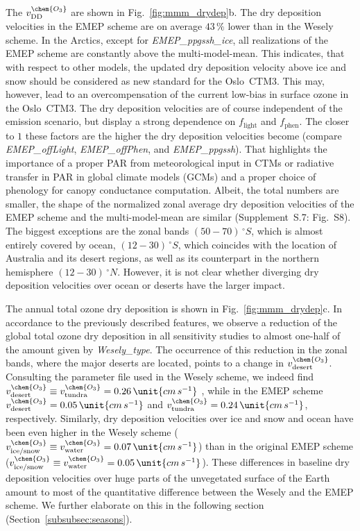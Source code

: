\documentclass[gmd, manuscript]{copernicus}
\begin{document}
The $v^\chem{O_3}_\text{DD}$ are shown in Fig.~\ref{fig:mmm_drydep}b. The dry deposition velocities in the EMEP scheme are on average $43\,\unit{\%}$ lower than in the Wesely scheme. In the Arctics, except for \emph{EMEP\_ppgssh\_ice}, all realizations of the EMEP scheme are constantly above the multi-model-mean. This indicates, that with respect to other models, the updated dry deposition velocity above ice and snow should be considered as new standard for the Oslo~CTM3. This may, however, lead to an overcompensation of the current low-bias in surface ozone in the Oslo~CTM3. The dry deposition velocities are of course independent of the emission scenario, but display a strong dependence on $f_\text{light}$ and $f_\text{phen}$. The closer to $1$ these factors are the higher the dry deposition velocities become (compare \emph{EMEP\_offLight}, \emph{EMEP\_offPhen}, and \emph{EMEP\_ppgssh}). That highlights the importance of a proper PAR from meteorological input in CTMs or radiative transfer in PAR in global climate models (GCMs) and a proper choice of phenology for canopy conductance computation. Albeit, the total numbers are smaller, the shape of the normalized zonal average dry deposition velocities of the EMEP scheme and the multi-model-mean are similar (Supplement~S.7: Fig.~S8). The biggest exceptions are the zonal bands $(50-70)\,\unit{^\circ S}$, which is almost entirely covered by ocean, $(12-30)\,\unit{^\circ S}$, which coincides with the location of Australia and its desert regions, as well as its counterpart in the northern hemisphere $(12-30)\,\unit{^\circ N}$. However, it is not clear whether diverging dry deposition velocities over ocean or deserts have the larger impact.

The annual total ozone dry deposition is shown in Fig.~\ref{fig:mmm_drydep}c. In accordance to the previously described features, we observe a reduction of the global total ozone dry deposition in all sensitivity studies to almost one-half of the amount given by \emph{Wesely\_type}. The occurrence of this reduction in the zonal bands, where the major deserts are located, points to a change in $v_\text{desert}^\chem{O_3}$. Consulting the parameter file used in the Wesely scheme, we indeed find $v_\text{desert}^\chem{O_3} \equiv v_\text{tundra}^\chem{O_3} = 0.26\,\unit{cm\,s^{-1}}$ \citep{JGR:Hough1991}, while in the EMEP scheme $v_\text{desert}^\chem{O_3}=0.05\,\unit{cm\,s^{-1}}$ and $v^\chem{O_3}_\text{tundra} = 0.24\,\unit{cm\,s^{-1}}$, respectively. Similarly, dry deposition velocities over ice and snow and ocean have been even higher in the Wesely scheme ($v_\text{ice/snow}^\chem{O_3}\equiv v_\text{water}^\chem{O_3}=0.07\,\unit{cm\,s^{-1}}$) than in the original EMEP scheme ($v_\text{ice/snow}^\chem{O_3}\equiv v_\text{water}^\chem{O_3}=0.05\,\unit{cm\,s^{-1}}$). These differences in baseline dry deposition velocities over huge parts of the unvegetated surface of the Earth amount to most of the quantitative difference between the Wesely and the EMEP scheme. We further elaborate on this in the following section (Section~\ref{subsubsec:seasons}).
\end{document}
